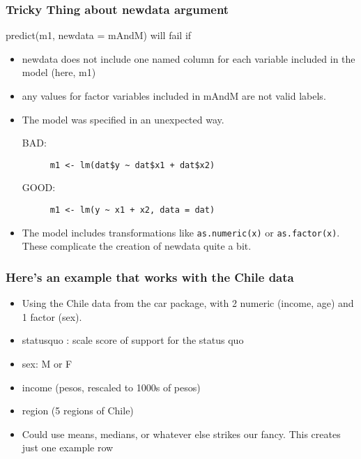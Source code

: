 \documentclass[10pt,english]{beamer}
\begin{document}
\begin{frame}[containsverbatim]
\frametitle{Tricky Thing about newdata argument}

predict(m1, newdata = mAndM) will fail if
\begin{itemize}
\item newdata does not include one named column for each variable included
in the model (here, m1)
\item any values for factor variables included in mAndM are not valid labels. 
\item The model was specified in an unexpected way.

\begin{description}
\item [{BAD:}] \lstinline!m1 <- lm(dat$y ~ dat$x1 + dat$x2)!
\item [{GOOD:}] \lstinline!m1 <- lm(y ~ x1 + x2, data = dat)!
\end{description}
\item The model includes transformations like \texttt{as.numeric(x)} or
\texttt{as.factor(x)}. These complicate the creation of newdata quite
a bit.
\end{itemize}
\end{frame}

\begin{frame}
\frametitle{Here's an example that works with the Chile data}
\begin{itemize}
\item Using the Chile data from the car package, with 2 numeric (income,
age) and 1 factor (sex).




\item statusquo : scale score of support for the status quo
\item sex: M or F
\item income (pesos, rescaled to 1000s of pesos)
\item region (5 regions of Chile)
\end{itemize}
\begin{itemize}
\item Could use means, medians, or whatever else strikes our fancy. This
creates just one example row




\end{itemize}
\end{frame}
\end{document}
